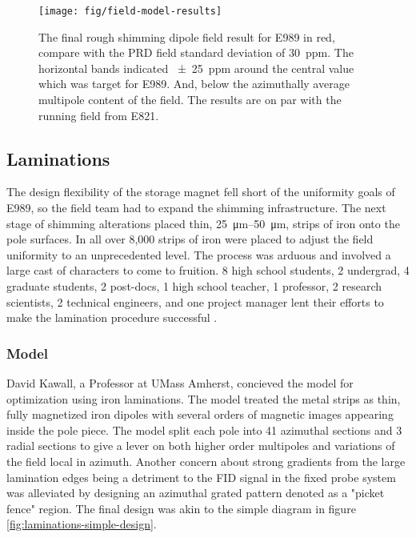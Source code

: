 \begin{figure}
\label{fig:field-model-results}
\texttt{[image: fig/field-model-results]}
\caption{The final rough shimming dipole field result for E989 in red, compare with the PRD field standard deviation of \SI{30}{ppm}.  The horizontal bands indicated \SI{\pm 25}{ppm} around the central value which was target for E989.  And, below the azimuthally average multipole content of the field.  The results are on par with the running field from E821.}
\end{figure}

\subsection{Laminations}

The design flexibility of the storage magnet fell short of the uniformity goals of E989, so the field team had to expand the shimming infrastructure.  The next stage of shimming alterations placed thin, \SIrange{25}{50}{\micro\meter}, strips of iron onto the pole surfaces.  In all over 8,000 strips of iron were placed to adjust the field uniformity to an unprecedented level.  The process was arduous and involved a large cast of characters to come to fruition.  8 high school students, 2 undergrad, 4 graduate students, 2 post-docs, 1 high school teacher, 1 professor, 2 research scientists, 2 technical engineers, and one project manager lent their efforts to make the lamination procedure successful .

\subsubsection{Model}

David Kawall, a Professor at UMass Amherst, concieved the model for optimization using iron laminations.  The model treated the metal strips as thin, fully magnetized iron dipoles with several orders of magnetic images appearing inside the pole piece.  The model split each pole into 41 azimuthal sections and 3 radial sections to give a lever on both higher order multipoles and variations of the field local in azimuth.  Another concern about strong gradients from the large lamination edges being a detriment to the FID signal in the fixed probe system was alleviated by designing an azimuthal grated pattern denoted as a "picket fence" region.  The final design was akin to the simple diagram in figure \ref{fig:laminations-simple-design}.

